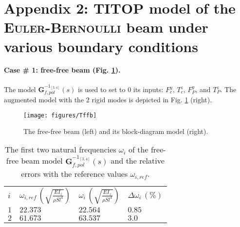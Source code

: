 \section*{Appendix 2: TITOP model of the \textsc{Euler-Bernoulli} beam under various boundary conditions}
\paragraph{Case \# 1: free-free beam (Fig. \ref{fig:Tff}).} The model $\mathbf{G}_{f,pol}^{-1_{[3,4]}}(s)$ is  used to set to $0$ its inputs: $F^y_c$, $T^z_c$, $F^y_P$, and $T^z_P$. The augmented model with the $2$ rigid modes is depicted in Fig. \ref{fig:Tff} (right).
\begin{figure}[htbp!]
  \texttt{[image: figures/Tffb]}
\caption{The free-free beam (left) and its block-diagram model (right).}
\label{fig:Tff} 
\end{figure}
\begin{table}[htbp!]
\caption{The first two natural frequencies $\omega_i$ of the free-free beam model $\mathbf{G}_{f,pol}^{-1_{[3,4]}}(s)$ and the relative errors with the reference values $\omega_{i,ref}$.}
\label{tab:Tff}       %
\begin{tabular}{llll}
\hline\noalign{\smallskip}
  $i$ & $\omega_{i,ref}\,\left(\sqrt{\frac{EI_z}{\rho S l^4}}\right)$ &  $\omega_i\,\left(\sqrt{\frac{EI_z}{\rho S l^4}}\right)$ &  $\Delta \omega_i\,(\%)$ \\
\noalign{\smallskip}\hline\noalign{\smallskip}
$1$ & $22.373$ & $22.564$  & $0.85$ \\ 
$2$ & $61.673$ & $63.537$ & $3.0$ \\
\hline
\end{tabular}
\end{table}

\FloatBarrier
